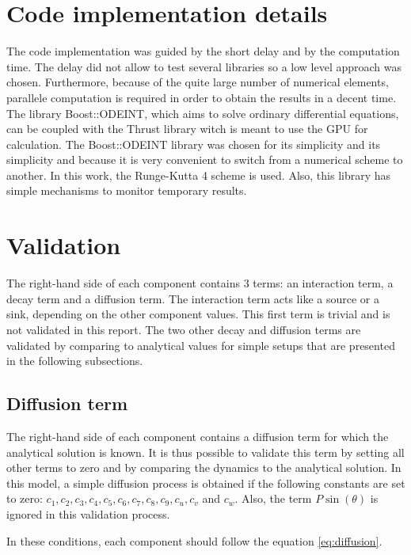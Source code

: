 \documentclass[a4paper]{article}
\begin{document}
\section{Code implementation details}

The code implementation was guided by the short delay and by the computation time. The delay did not allow to test several libraries so a low level approach was chosen. Furthermore, because of the quite large number of numerical elements, parallele computation is required in order to obtain the results in a decent time. The library Boost::ODEINT, which aims to solve ordinary differential equations, can be coupled with the Thrust library witch is meant to use the GPU for calculation. The Boost::ODEINT library was chosen for its simplicity and its simplicity and because it is very convenient to switch from a numerical scheme to another. In this work, the Runge-Kutta 4 scheme is used. Also, this library has simple mechanisms to monitor temporary results.

\section{Validation}

The right-hand side of each component contains 3 terms: an interaction term, a decay term and a diffusion term. The interaction term acts like a source or a sink, depending on the other component values. This first term is trivial and is not validated in this report. The two other decay and diffusion terms are validated by comparing to analytical values for simple setups that are presented in the following subsections.

\subsection{Diffusion term}

The right-hand side of each component contains a diffusion term for which the analytical solution is known. It is thus possible to validate this term by setting all other terms to zero and by comparing the dynamics to the analytical solution. In this model, a simple diffusion process is obtained if the following constants are set to zero: $c_1, c_2, c_3, c_4, c_5, c_6, c_7, c_8, c_9, c_u, c_v$ and $c_w$.
Also, the term $P \sin (\theta)$ is ignored in this validation process.

In these conditions, each component should follow the equation \ref{eq:diffusion}.
\end{document}
